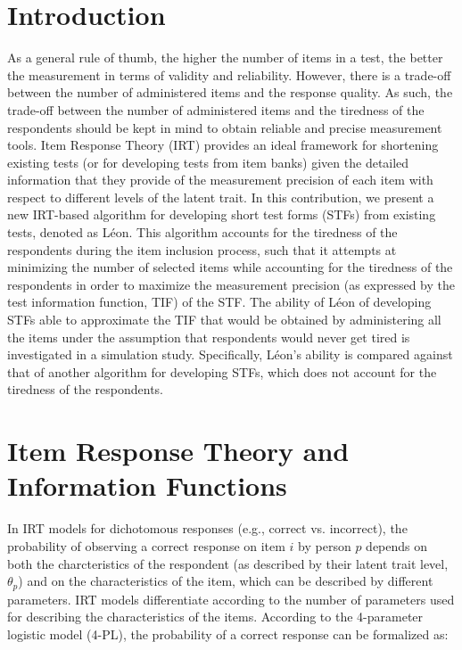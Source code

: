 \documentclass{svproc}
\begin{document}
\section{Introduction}
%
As a general rule of thumb, the higher the number of items in a test, the better the measurement in terms of validity and reliability. However, there is a trade-off between the number of administered items and the response quality. As such, the trade-off between the number of administered items and the tiredness of the respondents should be kept in mind to obtain reliable and precise measurement tools. Item Response Theory (IRT) provides an ideal framework for shortening existing tests (or for developing tests from item banks) given the detailed information that they provide of the measurement precision of each item with respect to different levels of the latent trait. 
In this contribution, we present a new IRT-based algorithm for developing short test forms (STFs) from existing tests, denoted as Léon. This algorithm accounts for the tiredness of the respondents during the item inclusion process, such that it attempts at minimizing the number of selected items while accounting for the tiredness of the respondents in order to maximize the measurement precision (as expressed by the test information function, TIF) of the STF.
The ability of Léon of developing STFs able to approximate the TIF that would be obtained by administering all the items under the assumption that respondents would never get tired is investigated in a simulation study. 
Specifically, Léon's ability is compared against that of another algorithm for developing STFs, which does not account for the tiredness of the respondents. 

\section{Item Response Theory and Information Functions}  

In IRT models for dichotomous responses (e.g., correct vs. incorrect), the probability of observing a correct response on item $i$ by person $p$ depends on both the charcteristics of the respondent (as described by their latent trait level, $\theta_p$) and on the characteristics of the item, which can be described by different parameters. IRT models differentiate according to the number of parameters used for describing the characteristics of the items. According to the 4-parameter logistic model (4-PL), the probability of a correct response can be formalized as: 
\end{document}
